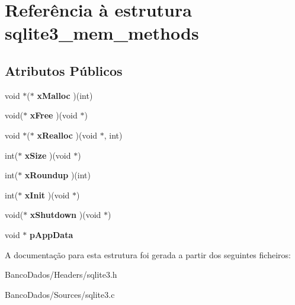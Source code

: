 \hypertarget{structsqlite3__mem__methods}{\section{Referência à estrutura sqlite3\-\_\-mem\-\_\-methods}
\label{structsqlite3__mem__methods}
}
\subsection*{Atributos Públicos}
\begin{DoxyCompactItemize}
\item 
\hypertarget{structsqlite3__mem__methods_acb9151cf501c851b61ab6b378832b159}{void $\ast$($\ast$ {\bfseries x\-Malloc} )(int)}\label{structsqlite3__mem__methods_acb9151cf501c851b61ab6b378832b159}

\item 
\hypertarget{structsqlite3__mem__methods_aa2e7fe8d030adaa17fd23a44fec1eca1}{void($\ast$ {\bfseries x\-Free} )(void $\ast$)}\label{structsqlite3__mem__methods_aa2e7fe8d030adaa17fd23a44fec1eca1}

\item 
\hypertarget{structsqlite3__mem__methods_a5bb7e62164d0934888473c618c61dc77}{void $\ast$($\ast$ {\bfseries x\-Realloc} )(void $\ast$, int)}\label{structsqlite3__mem__methods_a5bb7e62164d0934888473c618c61dc77}

\item 
\hypertarget{structsqlite3__mem__methods_a6c68275b577d66ae659ef30344c8f86c}{int($\ast$ {\bfseries x\-Size} )(void $\ast$)}\label{structsqlite3__mem__methods_a6c68275b577d66ae659ef30344c8f86c}

\item 
\hypertarget{structsqlite3__mem__methods_a8b3f0d1ddeb498c4aaf9bbce5b92a268}{int($\ast$ {\bfseries x\-Roundup} )(int)}\label{structsqlite3__mem__methods_a8b3f0d1ddeb498c4aaf9bbce5b92a268}

\item 
\hypertarget{structsqlite3__mem__methods_ad0997b548928358d655000b6ac825cf4}{int($\ast$ {\bfseries x\-Init} )(void $\ast$)}\label{structsqlite3__mem__methods_ad0997b548928358d655000b6ac825cf4}

\item 
\hypertarget{structsqlite3__mem__methods_a6f48100692bd935d7f3dbb8c701ab6ca}{void($\ast$ {\bfseries x\-Shutdown} )(void $\ast$)}\label{structsqlite3__mem__methods_a6f48100692bd935d7f3dbb8c701ab6ca}

\item 
\hypertarget{structsqlite3__mem__methods_af91b7adfa1f6aace0b129bac800bd444}{void $\ast$ {\bfseries p\-App\-Data}}\label{structsqlite3__mem__methods_af91b7adfa1f6aace0b129bac800bd444}

\end{DoxyCompactItemize}


A documentação para esta estrutura foi gerada a partir dos seguintes ficheiros\-:\begin{DoxyCompactItemize}
\item 
Banco\-Dados/\-Headers/sqlite3.\-h\item 
Banco\-Dados/\-Sources/sqlite3.\-c\end{DoxyCompactItemize}
